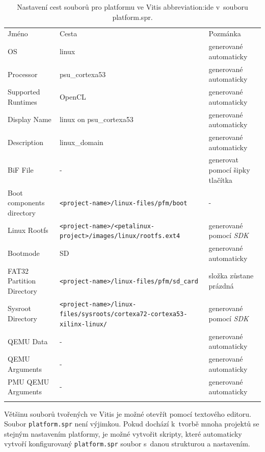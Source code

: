 \documentclass[a4paper, twoside, 11pt]{article}
\newcommand{\fbar}{\FloatBarrier}
\begin{document}
		\begin{table}[H]
			\centering
			\caption{Nastavení cest souborů pro platformu ve Vitis \gls{abbreviation:ide} v~souboru platform.spr.}
		  \vspace*{0.15cm}
		  \resizebox{\textwidth}{!}
		  {
			\begin{tabular}{!{\vrule width 2pt} l | l | l !{\vrule width 2pt}}
			Jméno & Cesta & Pozmánka\\
			OS & linux & generované automaticky\\ \hline
			Processor & psu\_cortexa53 & generované automaticky\\ \hline
			Supported Runtimes & OpenCL & generované automaticky\\ \hline
			Display Name & linux on psu\_cortexa53 & generované automaticky \\\hline
			Description & linux\_domain & generované automaticky\\ \hline
			BiF File & - & generovat pomocí šipky tlačítka\\ \hline
			Boot components directory & \texttt{<project-name>/linux-files/pfm/boot} & -\\ \hline
			Linux Rootfs & \texttt{<project-name>/<petalinux-project>/images/linux/rootfs.ext4} & generované pomocí \textit{SDK}\\ \hline
			Bootmode & SD & generované automaticky\\ \hline
			FAT32 Partition Directory & \texttt{<project-name>/linux-files/pfm/sd\_card} & složka zůstane prázdná\\ \hline
			Sysroot Directory & \texttt{<project-name>/linux-files/sysroots/cortexa72-cortexa53-xilinx-linux/} & generované pomocí \textit{SDK}\\ \hline
			QEMU Data & - & generované automaticky \\ \hline
			QEMU Arguments & - & generované automaticky \\ \hline
			PMU QEMU Arguments & - & generované automaticky \\
			\end{tabular}
		  }
			\label{tab:vitis-platform-spr-settings}
		\end{table}
		\fbar
		Většinu souborů tvořených ve Vitis je možné otevřít pomocí textového editoru.\\Soubor \texttt{platform.spr} není výjimkou. Pokud dochází k~tvorbě mnoha projektů se stejným nastavením platformy, je možné vytvořit skripty, které automaticky vytvoří konfigurovaný \texttt{platform.spr} soubor s~danou strukturou a nastavením.\par
\end{document}
